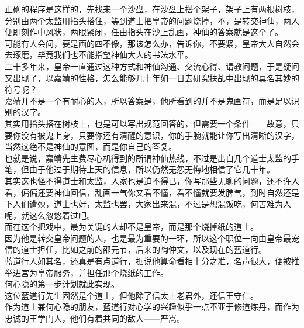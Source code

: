 \begin{multicols}{\theparacolNo}
正确的程序是这样的，先找来一个沙盘，在沙盘上搭个架子，架子上有两根树枝，分别由两个太监用指头搭住，等到道士把皇帝的问题烧掉，不，是转交神仙，两人便即刻作中风状，两眼紧闭，任由指头在沙上乱画，神仙的答案就是这个了。\\

可能有人会问，要是画的四不像，那该怎么办，告诉你，不要紧，皇帝大人自然会去琢磨，毕竟我们也不能指望神仙大人的书法水平。\\

二十多年来，皇帝一直通过这种方式和神仙沟通、交流心得、请教问题，于是疑问又出现了，以嘉靖的性格，怎么能够几十年如一日去研究扶乩中出现的莫名其妙的符号呢？\\

嘉靖并不是一个有耐心的人，所以答案是，他所看到的并不是鬼画符，而是足以识别的汉字。\\

其实用指头搭在树枝上，也是可以写出规范回答的，但需要一个条件——故意，只要你没有被鬼上身，只要你还有清醒的意识，你的手腕就能让你写出清晰的汉字，当然这绝不是神仙的意图，而是你自己的答复。\\

也就是说，嘉靖先生费尽心机得到的所谓神仙热线，不过是出自几个道士太监的手笔，但由于他过于期待上天的信息，所以仍然无怨无悔地相信了它几十年。\\

其实这也怪不得道士和太监，人家也是迫不得已，你写那些无聊的问题，还不许人看，偏偏还要神仙回信，乱画一气你又看不懂，看不懂就要发脾气，到时自然还是下人们遭殃，道士也好，太监也罢，大家出来混，不过是想混饭吃，何苦难为人呢，就这么忽悠着过吧。\\

而在这个把戏中，最为关键的人却不是皇帝，而是那个烧掉纸的道士。\\

因为他是转交皇帝问题的人，也是最为重要的一环，所以这个职位一向由皇帝最宠信的道士担任，比如之前的邵元节，后来的陶仲文，以及现在的蓝道行。\\

蓝道行人如其名，还真是有点道行，据说他算命看相十分之准，名声很大，便被推举进宫为皇帝服务，并担任那个烧纸的工作。\\

何心隐的第一步计划就此实现。\\

这位蓝道行先生固然是个道士，但他除了信太上老君外，还信王守仁。\\

作为道士兼何心隐的朋友，蓝道行对心学的兴趣似乎一点不亚于修道炼丹，而作为忠诚的王学门人，他们有着共同的敌人——严嵩。\\


\end{multicols}

